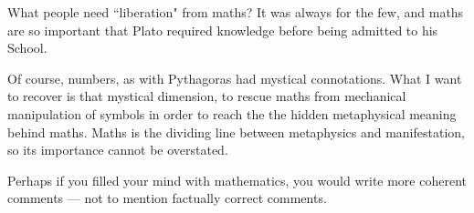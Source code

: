 \begin{footnotesize}
\begin{sffamily}
What people need ``liberation" from maths? It was always for the few, and maths are so important that Plato required knowledge before being admitted to his School.

Of course, numbers, as with Pythagoras had mystical connotations. What I want to recover is that mystical dimension, to rescue maths from mechanical manipulation of symbols in order to reach the the hidden metaphysical meaning behind maths. Maths is the dividing line between metaphysics and manifestation, so its importance cannot be overstated.

Perhaps if you filled your mind with mathematics, you would write more coherent comments — not to mention factually correct comments.


\end{sffamily}\end{footnotesize}
